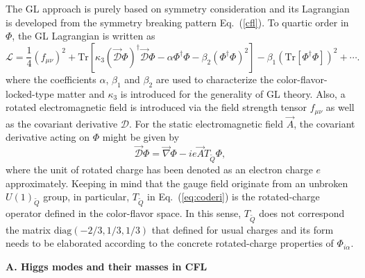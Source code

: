 \documentclass[12pt]{article}
\begin{document}
The GL approach is purely based on symmetry consideration and its Lagrangian is developed from the symmetry breaking pattern Eq.~(\ref{cfl}).
To quartic order in $\Phi$, the GL Lagrangian is written as
\begin{equation}
\mathcal{L}= \frac{1}{4} (f_{\mu\nu})^2 +
\text{Tr}\left[\kappa_3(\vec{\mathcal{D}}\Phi)^\dagger\vec{\mathcal{D}}\Phi
  -\alpha\Phi^\dagger\Phi -\beta_2(\Phi^\dagger\Phi)^2\right]
-\beta_1(\text{Tr}[\Phi^\dagger\Phi])^2 +\cdots .\label{gl}
\end{equation}
where the coefficients $\alpha$, $\beta_1$ and $\beta_2$ are used to characterize the color-flavor-locked-type matter and $\kappa_3$ is introduced for the generality of GL theory.
Also, a rotated electromagnetic field is introduced via the field strength tensor $f_{\mu\nu}$
as well as the covariant derivative ${\mathcal{D}}$.
For the static electromagnetic field $\vec{A}$,
the covariant derivative acting on $\Phi$ might be given by
\begin{equation}\label{eq:coderi}
\vec{\mathcal{D}}\Phi =\vec{\nabla} \Phi -ie\vec{A} T_{\widetilde{Q}}\Phi,
\end{equation}
where the unit of rotated charge has been denoted as an electron charge $e$ approximately.
Keeping in mind that the gauge field originate from an unbroken $U(1)_{\widetilde{Q}}$ group, in particular,
$T_{\widetilde{Q}}$ in Eq.~(\ref{eq:coderi}) is the rotated-charge operator defined in the color-flavor space. In this sense, $T_{\widetilde{Q}}$ does not correspond the matrix
$\text{diag}(-2/3,1/3,1/3)$ that defined for usual charges and its form needs to be elaborated
according to the concrete rotated-charge properties of $\Phi_{i \alpha}$.

\vspace{0.2cm}
\textbf{A. Higgs modes and their masses in CFL}
\vspace{0.2cm}
\end{document}
